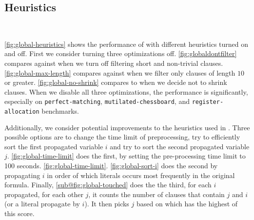 
\subsection{Heuristics}~\label{subsec:heuristics}

\autoref{fig:global-heuristics} shows the performance of \tool with different
heuristics turned on and off. First we consider turning three optimizations off.
\autoref{fig:globaldontfilter} compares against when we turn off filtering short
and non-trivial \pr clauses. \autoref{fig:global-max-length} compares against
when we filter only clauses of length $10$ or greater.
\autoref{fig:global-no-shrink} compares to when we decide not to shrink clauses.
When we disable all three optimizations, the performance is significantly,
especially on \texttt{perfect-matching}, \texttt{mutilated-chessboard}, and
\texttt{register-allocation} benchmarks.

Additionally, we consider potential improvements to the heuristics used in
\tool. Three possible options are to change the time limit of preprocessing, try
to efficiently sort the first propagated variable $i$ and try to sort the second
propagated variable $j$. \autoref{fig:global-time-limit} does the first, by
setting the pre-processing time limit to 100 seconds.
\autoref{fig:global-time-limit}. \autoref{fig:global-sort-i} does the second by
propagating $i$ in order of which literals occurs most frequently in the
original formula. Finally, \autoref{sub@fig:global-touched} does the the third,
for each $i$ propagated, for each other $j$, it counts the number of clauses
that contain $j$ and $i$ (or a literal propagate by $i$). It then picks $j$
based on which has the highest of this score.


